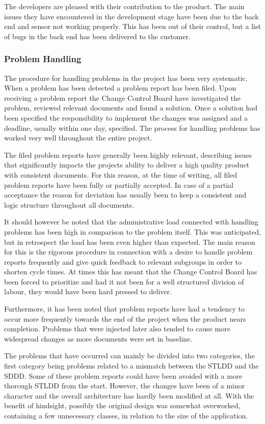 \documentclass[a4paper]{article}
\begin{document}
The developers are pleased with their contribution to the product. The main issues they have encountered in the development stage have been due to the back end and sensor not working properly. This has been out of their control, but a list of bugs in the back end has been delivered to the customer. 

\subsubsection{Problem Handling}

The procedure for handling problems in the project has been very systematic. When a problem has been detected a problem report has been filed. Upon receiving a problem report the Change Control Board have investigated the problem, reviewed relevant documents and found a solution. Once a solution had been specified the responsibility to implement the changes was assigned and a deadline, usually within one day, specified. The process for handling problems has worked very well throughout the entire project. 

The filed problem reports have generally been highly relevant, describing issues that significantly impacts the projects ability to deliver a high quality product with consistent documents. For this reason, at the time of writing, all filed problem reports have been fully or partially accepted. In case of a partial acceptance the reason for deviation has usually been to keep a consistent and logic structure throughout all documents.

It should however be noted that the administrative load connected with handling problems has been high in comparison to the problem itself. This was anticipated, but in retrospect the load has been even higher than expected. The main reason for this is the rigorous procedure in connection with a desire to handle problem reports frequently and give quick feedback to relevant subgroups in order to shorten cycle times. At times this has meant that the Change Control Board has been forced to prioritize and had it not been for a well structured division of labour, they would have been hard pressed to deliver.

Furthermore, it has been noted that problem reports have had a tendency to occur more frequently towards the end of the project when the product nears completion. Problems that were injected later also tended to cause more widespread changes as more documents were set in baseline.

The problems that have occurred can mainly be divided into two categories, the first category being problems related to a mismatch between the STLDD and the SDDD. Some of these problem reports could have been avoided with a more thorough STLDD from the start. However, the changes have been of a minor character and the overall architecture has hardly been modified at all. With the benefit of hindsight, possibly the original design was somewhat overworked, containing a few unnecessary classes, in relation to the size of the application.
\end{document}
